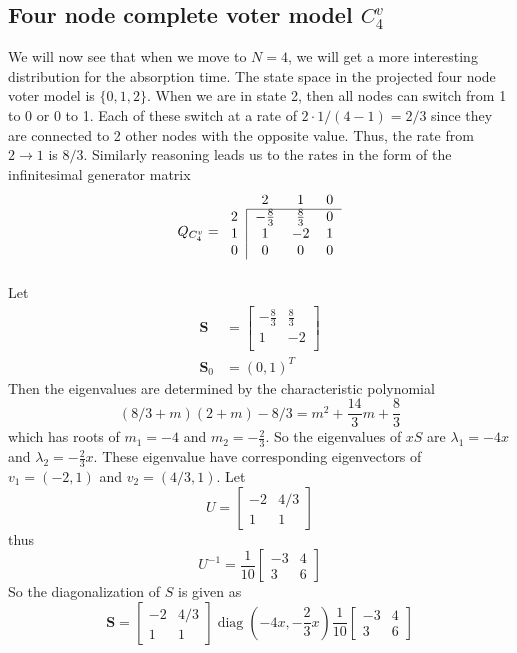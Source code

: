\subsection{Four node complete voter model \texorpdfstring{$C^{v}_4$}{VC4}}
We will now see that when we move to $N = 4$, we will get a more interesting distribution for the absorption time.
The state space in the projected four node voter model is $\{0,1,2\}$.
When we are in state 2, then all nodes can switch from 1 to 0 or 0 to 1.
Each of these switch at a rate of $2 \cdot 1/(4 - 1) = 2/3$ since they are connected to 2 other nodes with the opposite value.
Thus, the rate from $2 \to 1$ is $8/3$.
Similarly reasoning leads us to the rates in the form of the infinitesimal generator matrix
$$
Q_{C^{v}_4} = \begin{blockarray}{cccc}
    & 2 & 1 & 0\\
    \begin{block}{c|ccc}
        \cline{2-4}
        2 & -\frac{8}{3} & \frac{8}{3} & 0 \\
        1 & 1 & -2 & 1\\
        0 & 0 & 0 & 0\\
    \end{block}
\end{blockarray}
$$
Let
\begin{align*}
    \mathbf{S} &= \begin{bmatrix}
    -\frac{8}{3} & \frac{8}{3}\\
    1 & -2\\
    \end{bmatrix}\\
    \mathbf{S}_0 &= (0, 1)^T
\end{align*}
Then the eigenvalues are determined by the characteristic polynomial
$$
(8/3 + m)(2 + m) - 8/3 = m^2 + \frac{14}{3} m + \frac{8}{3}
$$
which has roots of $m_1 = -4$ and $m_2 = - \frac{2}{3}$.
So the eigenvalues of $xS$ are $\lambda_1 = -4x$ and $\lambda_2 =  - \frac{2}{3} x$.
These eigenvalue have corresponding eigenvectors of $v_1 = (-2, 1)$ and $v_2 = (4/3, 1)$.
Let
$$
U = \begin{bmatrix}
    -2 & 4/3\\
    1 & 1
\end{bmatrix}
$$
thus
$$
U^{-1} = \frac{1}{10} \begin{bmatrix}
    -3 & 4\\
    3 & 6
\end{bmatrix}
$$
So the diagonalization of $S$ is given as
$$
\mathbf{S} = \begin{bmatrix}
    -2 & 4/3\\
    1 & 1
\end{bmatrix} \operatorname{diag}(-4x, - \frac{2}{3} x)
\frac{1}{10} \begin{bmatrix}
    -3 & 4\\
    3 & 6
\end{bmatrix}
$$
